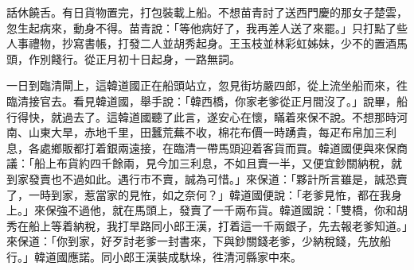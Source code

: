 話休饒舌。有日貨物置完，打包裝載上船。不想苗青討了送西門慶的那女子楚雲，忽生起病來，動身不得。{}苗青說：「等他病好了，我再差人送了來罷。」只打點了些人事禮物，抄寫書帳，打發二人並胡秀起身。王玉枝並林彩虹姊妹，少不的置酒馬頭，作別餞行。從正月初十日起身，一路無詞。

一日到臨清閘上，這韓道國正在船頭站立，忽見街坊嚴四郎，從上流坐船而來，徃臨清接官去。看見韓道國，舉手說：「韓西橋，你家老爹從正月間沒了。」說畢，船行得快，就過去了。這韓道國聽了此言，遂安心在懷，瞞着來保不說。不想那時河南、山東大旱，赤地千里，田蠶荒蕪不收，棉花布價一時踴貴，每疋布帛加三利息，各處鄉販都打着銀兩遠接，在臨清一帶馬頭迎着客貨而買。韓道國便與來保商議：「船上布貨約四千餘兩，見今加三利息，不如且賣一半，又便宜鈔關納稅，就到家發賣也不過如此。遇行市不賣，誠為可惜。」來保道：「夥計所言雖是，誠恐賣了，一時到家，惹當家的見恠，如之奈何？」韓道國便說：「老爹見恠，都在我身上。」來保強不過他，就在馬頭上，發賣了一千兩布貨。韓道國說：「雙橋，你和胡秀在船上等着納稅，我打旱路同小郎王漢，打着這一千兩銀子，先去報老爹知道。」來保道：「你到家，好歹討老爹一封書來，下與鈔關錢老爹，少納稅錢，先放船行。」韓道國應諾。同小郎王漢裝成馱垛，徃清河縣家中來。

